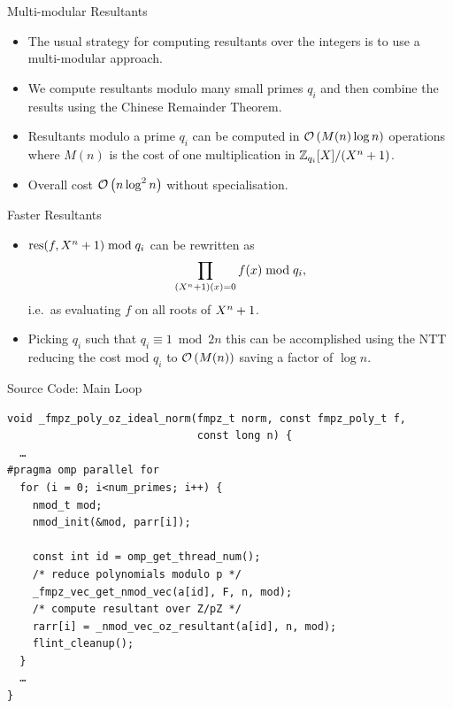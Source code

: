\documentclass[presentation,smaller]{beamer}
\begin{document}
\begin{frame}[label={sec:orgheadline21}]{Multi-modular Resultants}
\begin{itemize}
\item The usual strategy for computing resultants over the integers is to use a multi-modular approach.
\item We compute resultants modulo many small primes \(q_i\) and then combine the results using the Chinese Remainder Theorem.
\item Resultants modulo a prime \(q_i\) can be computed in \(\mathcal{O}\left( {M(n} \right)\log n)\) operations where \(M(n)\) is the cost of one multiplication in \(\Z_{q_i}[X]/(\cycf)\).
\item Overall cost \(\mathcal{O}\left( {n \log^2 n} \right)\) without specialisation.
\end{itemize}
\end{frame}

\begin{frame}[label={sec:orgheadline22}]{Faster Resultants}
\begin{itemize}
\item \(\operatorname{res}(f,X^n+1) \bmod q_i\) can be rewritten as \[\prod_{(X^n+1)(x) = 0} f(x) \bmod q_i,\] i.e. as evaluating \(f\) on all roots of \(X^n+1\).

\item Picking \(q_i\) such that \(q_i \equiv 1 \bmod 2n\) this can be accomplished using the NTT reducing the cost mod \(q_i\) to \(\mathcal{O}\left( {M(n} \right))\) saving a factor of \(\log n\).
\end{itemize}
\end{frame}

\begin{frame}[fragile,label={sec:orgheadline23}]{Source Code: Main Loop}
 \lstset{language=C,label= ,caption= ,captionpos=b,numbers=none}
\begin{lstlisting}
void _fmpz_poly_oz_ideal_norm(fmpz_t norm, const fmpz_poly_t f,
                              const long n) {
  …
#pragma omp parallel for
  for (i = 0; i<num_primes; i++) {
    nmod_t mod;
    nmod_init(&mod, parr[i]);

    const int id = omp_get_thread_num();
    /* reduce polynomials modulo p */
    _fmpz_vec_get_nmod_vec(a[id], F, n, mod);
    /* compute resultant over Z/pZ */
    rarr[i] = _nmod_vec_oz_resultant(a[id], n, mod);
    flint_cleanup();
  }
  …
}
\end{lstlisting}
\end{frame}
\end{document}
